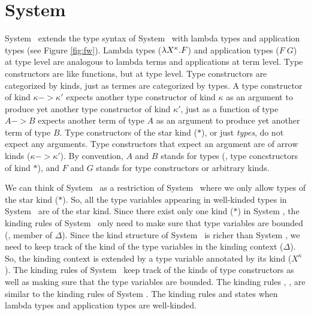 \section{System \Fw} \label{sec:fw}
System \Fw\ extends the type syntax of System \F\ with lambda types and
application types (see Figure \ref{fig:fw}). Lambda types ($\lambda X^\kappa.F$)
and application types ($F\;G$) at type level are analogous to lambda terms
and applications at term level. Type constructors are like functions, but
at type level. Type constructors are categorized by kinds, just as termes
are categorized by types. A type constructor of kind $\kappa -> \kappa'$
expects another type constructor of kind $\kappa$ as an argument to produce
yet another type constructor of kind $\kappa'$, just as a function of type
$A -> B$ expects another term of type $A$ as an argument to produce yet another
term of type $B$. Type constructors of the star kind ($*$), or just
\emph{types}, do not expect any arguments. Type constructors that expect
an argument are of arrow kinds ($\kappa -> \kappa'$). By convention,
$A$ and $B$ stands for types (\ie, type concstructors of kind $*$),
and $F$ and $G$ stands for type constructors or arbitrary kinds.

We can think of System \F\ as a restriction of System \Fw\ where we only
allow types of the star kind ($*$). So, all the type variables appearing in
well-kinded types in System \F\ are of the star kind. Since there exist only
one kind ($*$) in System \F, the kinding rules of System \F\ only need to make
sure that type variables are bounded (\ie, member of $\Delta$). 
Since the kind structure of System \Fw\ is richer than System \F, we need to
keep track of the kind of the type variables in the kinding context ($\Delta$).
So, the kinding context is extended by a type variable annotated by its kind
($X^\kappa$). The kinding rules of System \Fw\ keep track of the kinds of
type constructors as well as making sure that the type variables are bounded.
The kinding rules , , 
are similar to the kinding rules of System \F. The kinding rules
 and  states when lambda types and
application types are well-kinded.


